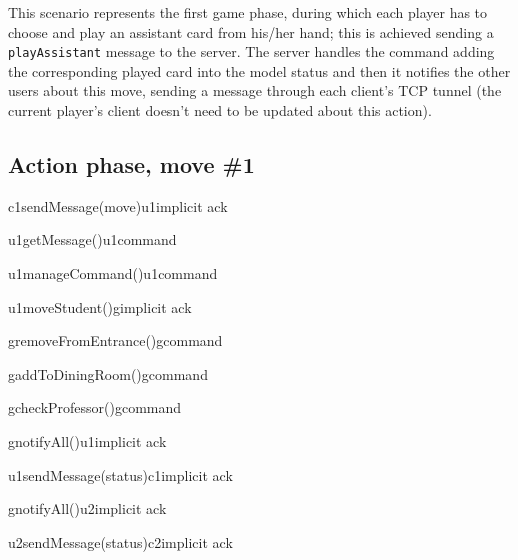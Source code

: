 \documentclass[a4paper]{article}
\begin{document}
	This scenario represents the first game phase, during which each player has to choose and play an assistant card from his/her hand; this is achieved sending a \verb|playAssistant| message to the server. The server handles the command adding the corresponding played card into the model status and then it notifies the other users about this move, sending a message through each client's TCP tunnel (the current player's client doesn't need to be updated about this action).

	\pagebreak

	\subsection{Action phase, move \#1}

	\begin{center}
		\begin{sequencediagram}

			\begin{call}{c1}{sendMessage(move)}{u1}{implicit ack}
				\begin{call}{u1}{getMessage()}{u1}{command}
				\end{call}
				\begin{call}{u1}{manageCommand()}{u1}{command}
				\end{call}
				\begin{call}{u1}{moveStudent()}{g}{implicit ack}
					\begin{call}{g}{removeFromEntrance()}{g}{command}
					\end{call}
					\begin{call}{g}{addToDiningRoom()}{g}{command}
					\end{call}
					\begin{call}{g}{checkProfessor()}{g}{command}
					\end{call}
					\begin{call}{g}{notifyAll()}{u1}{implicit ack}
						\begin{call}{u1}{sendMessage(status)}{c1}{implicit ack}
						\end{call}
					\end{call}
					\begin{call}{g}{notifyAll()}{u2}{implicit ack}
						\begin{call}{u2}{sendMessage(status)}{c2}{implicit ack}
						\end{call}
					\end{call}
				\end{call}
			\end{call}
		\end{sequencediagram}
	\end{center}
\end{document}
